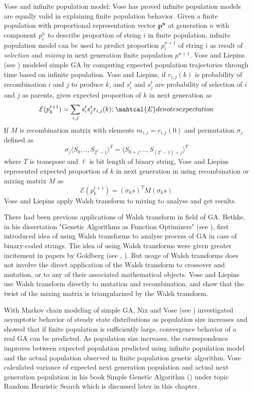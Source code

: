 Vose and infinite population model:
Vose has proved infinite population models are equally valid in explaining finite population behavior. 
Given a finite population with proportional representation vector $\bm{p^n}$ at generation $n$ with 
component $p_i^n$ to describe proportion of string $i$ in finite population, infinite population model 
can be used to predict proportion $p_i^{n+1}$ of string $i$ as result of \textit{selection} and 
\textit{mixing} in next generation finite population $p^{n+1}$. Vose and Liepins (see \cite{VoseLiepins1991}) 
modeled simple GA by computing expected population trajectories through time based on infinite population. 
Vose and Liepins, if $r_{i,j}(k)$ is probability of recombination $i$ and $j$ to produce $k$, and $s_i^t$ and $s_j^t$ 
are probability of selection of $i$ and $j$ as parents, gives expected proporiton of $k$ in next generation as
\[
\mathcal{E}(p_k^{t+1}) = \sum_{i,j} s_i^t s_j^t r_{i,j}(k) ; \hspace{1pt} \mahtcal{E} denotes expectation
\]
If $M$ is recombination matrix with elements $m_{i,j} = r_{i,j}(0)$ and permutation $\sigma_j$ defined as 
\[
\sigma_j{\langle S_0,..,S_{2^\ell - 1} \rangle}^{T} = {\langle S_{0+j},..,S_{(2^\ell - 1)+j} \rangle}^{T}
\]
where $T$ is transpose and $\ell$ is bit length of binary string, Vose and Liepins represented expected proportion 
of $k$ in next generation in using recombination or mixing matrix $M$ as
\[
\mathcal{E}(p_k^{t+1}) = (\sigma_k s)^T M (\sigma_k s)
\]
Vose and Liepins apply Walsh transform to mixing to analyse and get results. 

There had been previous applications of Walsh transform in field of GA. Bethke, in his dissertation 
"Genetic Algorithms as Function Optimizers" (see \cite{Bethke1981}), first introduced 
idea of using Walsh transforms to analyse process of GA in case of binary-coded strings. The idea of using Walsh transforms 
were given greater incitement in papers by Goldberg (see \cite{Goldberg1989a}, \cite{Goldberg1989b}). But usage of 
Walsh transforms does not involve the direct application of the Walsh transform to crossover and mutation, or to any of their 
associated mathematical objects. Vose and Liepins use Walsh transform directly to mutation and recombination, and show that the twist of the mixing matrix 
is triangularized by the Walsh transform. 

With Markov chain modeling of simple GA, Nix and Vose (see \cite{Nix1992}) investigated asymptotic behavior of steady 
state distributions as population size increases and showed that if finite population is sufficiently large, 
convergence behavior of a real GA can be predicted. As population size increases, the correspondence improves 
between expected population predicted using infinite population model and the actual population observed in 
finite population genetic algorithm.  Vose calculated variance of expected next generation population and 
actual next generation population in his book Simple Genetic Algorithm (\cite{Vose1999}) under topic 
Random Heuristic Search which is discussed later in this chapter. 

